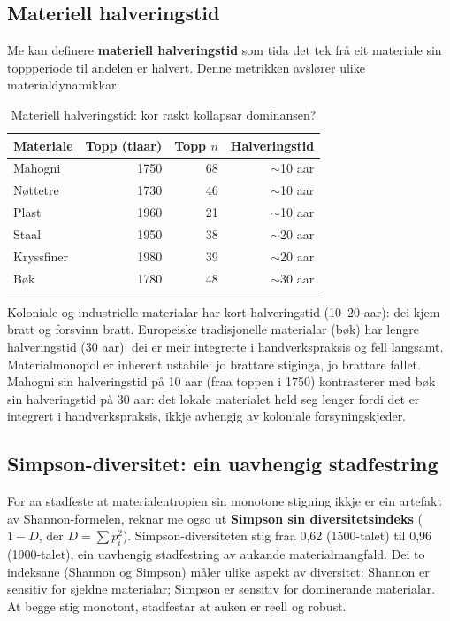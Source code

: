 \documentclass[10pt, a4paper, twocolumn]{article}
\begin{document}
\subsection{Materiell halveringstid}

Me kan definere \textbf{materiell halveringstid} som tida det tek frå eit materiale sin toppperiode til andelen er halvert. Denne metrikken avslører ulike materialdynamikkar:

\begin{table}[H]
\centering
\caption{Materiell halveringstid: kor raskt kollapsar dominansen?}
\label{tab:halflife}
\begin{tabular}{@{}lrrr@{}}
\toprule
\textbf{Materiale} & \textbf{Topp (tiaar)} & \textbf{Topp $n$} & \textbf{Halveringstid} \\
\midrule
Mahogni & 1750 & 68 & $\sim$10 aar \\
Nøttetre & 1730 & 46 & $\sim$10 aar \\
Plast & 1960 & 21 & $\sim$10 aar \\
Staal & 1950 & 38 & $\sim$20 aar \\
Kryssfiner & 1980 & 39 & $\sim$20 aar \\
Bøk & 1780 & 48 & $\sim$30 aar \\
\bottomrule
\end{tabular}
\end{table}

Koloniale og industrielle materialar har kort halveringstid (10--20 aar): dei kjem bratt og forsvinn bratt. Europeiske tradisjonelle materialar (bøk) har lengre halveringstid (30 aar): dei er meir integrerte i handverkspraksis og fell langsamt. Materialmonopol er inherent ustabile: jo brattare stiginga, jo brattare fallet. Mahogni sin halveringstid på 10 aar (fraa toppen i 1750) kontrasterer med bøk sin halveringstid på 30 aar: det lokale materialet held seg lenger fordi det er integrert i handverkspraksis, ikkje avhengig av koloniale forsyningskjeder.

\subsection{Simpson-diversitet: ein uavhengig stadfestring}

For aa stadfeste at materialentropien sin monotone stigning ikkje er ein artefakt av Shannon-formelen, reknar me ogso ut \textbf{Simpson sin diversitetsindeks} ($1 - D$, der $D = \sum p_i^2$). Simpson-diversiteten stig fraa 0,62 (1500-talet) til 0,96 (1900-talet), ein uavhengig stadfestring av aukande materialmangfald. Dei to indeksane (Shannon og Simpson) måler ulike aspekt av diversitet: Shannon er sensitiv for sjeldne materialar; Simpson er sensitiv for dominerande materialar. At begge stig monotont, stadfestar at auken er reell og robust.
\end{document}
